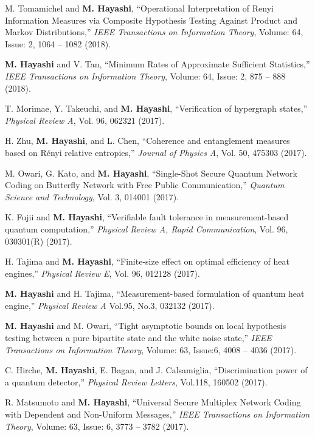 \documentclass[a4paper,12pt,oneside]{article}
\begin{document}
\begin{enumerate}
M. Tomamichel and \textbf{M. Hayashi}, 
``Operational Interpretation of Renyi Information Measures via Composite Hypothesis Testing Against Product and Markov Distributions,''
{\em IEEE Transactions on Information Theory},
Volume: 64, Issue: 2, 1064 -- 1082 (2018). 

\textbf{M. Hayashi} and V. Tan, 
``Minimum Rates of Approximate Sufficient Statistics,''
{\em IEEE Transactions on Information Theory},
Volume: 64, Issue: 2, 875 -- 888 (2018). 

T. Morimae, Y. Takeuchi, and \textbf{M. Hayashi},
``Verification of hypergraph states,''
{\em Physical Review A}, Vol. 96, 062321 (2017).

H. Zhu, \textbf{M. Hayashi}, and L. Chen, 
``Coherence and entanglement measures based on R\'{e}nyi relative entropies,''
{\em Journal of Physics A},
Vol. 50, 475303 (2017).

\bibitem{}
M. Owari, G. Kato, and \textbf{M. Hayashi},
``Single-Shot Secure Quantum Network Coding on Butterfly Network with Free Public Communication,''
{\em Quantum Science and Technology},
Vol. 3, 014001 (2017). 

\bibitem{}
K. Fujii and \textbf{M. Hayashi},
``Verifiable fault tolerance in measurement-based quantum computation,''
{\em Physical Review A, Rapid Communication},
Vol. 96, 030301(R) (2017).

\bibitem{}
H. Tajima and \textbf{M. Hayashi},
``Finite-size effect on optimal efficiency of heat engines,''
{\em Physical Review E}, Vol. 96, 012128 (2017).

\bibitem{}
\textbf{M. Hayashi} and H. Tajima, 
``Measurement-based formulation of quantum heat engine,'' 
{\em Physical Review A} Vol.95, No.3, 032132 (2017). 

\bibitem{}
\textbf{M. Hayashi} and M. Owari, 
``Tight asymptotic bounds on local hypothesis testing between a pure bipartite state and the white noise state,'' 
{\em IEEE Transactions on Information Theory}, 
Volume: 63, Issue:6, 4008 -- 4036 (2017). 

\bibitem{}
C. Hirche, \textbf{M. Hayashi}, E. Bagan, and J. Calsamiglia, 
``Discrimination power of a quantum detector,'' 
{\em Physical Review Letters}, Vol.118, 160502 (2017). 

\bibitem{}
R. Matsumoto and \textbf{M. Hayashi},  
``Universal Secure Multiplex Network Coding with Dependent and Non-Uniform Messages,'' 
{\em IEEE Transactions on Information Theory}, Volume: 63, Issue: 6, 3773 -- 3782 (2017). 


\end{enumerate}
\end{document}
